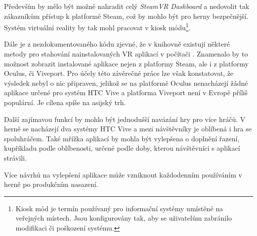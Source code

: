 Především by mělo být možné nahradit celý \emph{SteamVR Dashboard} a
nedovolit tak zákazníkům přístup k platformě Steam, což by mohlo být pro
herny bezpečnější. Systém virtuální reality by tak mohl pracovat v
kiosk módu\footnote{Kiosk mód je termín používaný pro informační systémy umístěné na veřejných místech. Jsou konfigurovány tak, aby se uživatelům zabránilo modifikaci či poškození systému.}. 

Dále je z nezdokumentovaného kódu zjevné, že v
knihovně existují některé metody pro stahování nainstalovaných VR
aplikací v počítači \autocite{openvrhidden}. Znamenalo by to možnost zobrazit instalované aplikace
nejen z platformy Steam, ale i z platformy Oculus, či Viveport. Pro
účely této závěrečné práce lze však konstatovat, že výsledek nebyl o nic
připraven, jelikož se na platformě Oculus nenacházejí žádné aplikace
určené pro systém HTC Vive a platforma Viveport není v Evropě příliš
populární. Je cílena spíše na asijský trh. \autocite{viveportasia}

Další zajímavou funkcí by mohlo být jednodušší navázání hry pro více
hráčů. V herně se nacházejí dva systémy HTC Vive a mezi návštěvníky je
oblíbená i hra se spoluhráčem. Také mřížka aplikací by mohla být vylepšena o
doplnění řazení, kupříkladu podle oblíbenosti, určené podle doby, kterou
návštěvníci s aplikací strávili.

Více návrhů na vylepšení aplikace může vzniknout každodenním používáním
v herně po produkčním nasazení.
